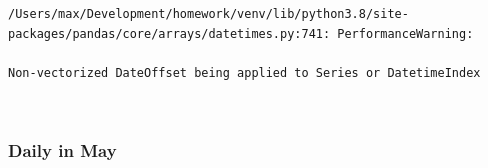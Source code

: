 \documentclass[11pt]{article}
\begin{document}
    \begin{Verbatim}[commandchars=\\\{\}]
/Users/max/Development/homework/venv/lib/python3.8/site-
packages/pandas/core/arrays/datetimes.py:741: PerformanceWarning:

Non-vectorized DateOffset being applied to Series or DatetimeIndex

    \end{Verbatim}

    \begin{center}
    \end{center}
    { \hspace*{\fill} \\}
    
    \hypertarget{daily-in-may}{%
\subsubsection{Daily in May}\label{daily-in-may}}
\end{document}
